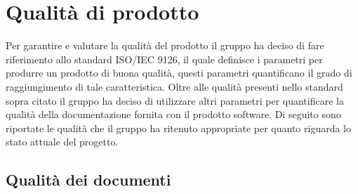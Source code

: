 \section{Qualità di prodotto}
	Per garantire e valutare la qualità del prodotto il gruppo ha deciso di fare riferimento allo standard ISO/IEC 9126, il quale definisce i parametri per produrre un prodotto di buona qualità, questi parametri quantificano il grado di raggiungimento di tale caratteristica. Oltre alle qualità presenti nello standard sopra citato il gruppo ha deciso di utilizzare altri parametri per quantificare la qualità della documentazione fornita con il prodotto software. Di seguito sono riportate le qualità che il gruppo ha ritenuto appropriate per quanto riguarda lo stato attuale del progetto.
%		
%		
%		
%		
%		
	\subsection{Qualità dei documenti}
		
